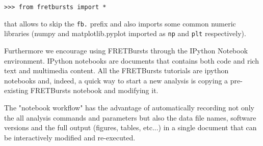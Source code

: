 \begin{verbatim}
>>> from fretbursts import *
\end{verbatim}

that allows to skip the \verb|fb.| prefix and also imports some common numeric
libraries (numpy and matplotlib.pyplot imported as \verb|np| and \verb|plt|
respectively).

Furthermore we encourage using FRETBursts through the IPython Notebook
environment. IPython notebooks are documents that contains both code and
rich text and multimedia content. All the FRETBursts tutorials are 
ipython notebooks and, indeed, a quick way to start a new analysis is copying 
a pre-existing FRETBursts notebook and modifying it.

The "notebook workflow"\cite{Shen_2014} has the advantage of automatically
recording not only the all analysis commands and parameters but also the
data file names, software versions and the full output 
(figures, tables, etc...) in a single document that can be interactively 
modified and re-executed.


